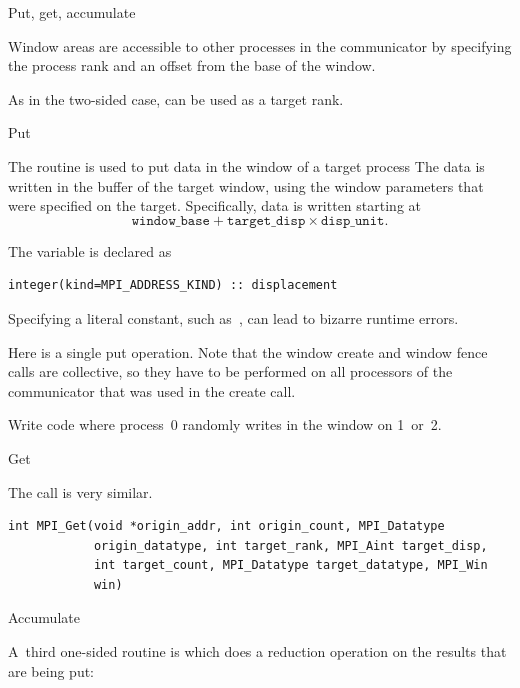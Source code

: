 
 {Put, get, accumulate}
\label{sec:putget}

Window areas are 
accessible to other processes in the communicator by specifying the
process rank and an offset from the base of the window.

As in the two-sided case,  can be used as
a target rank.

 {Put}

The  routine is used to put data in the window
of a target process
%
%
The data is written in the buffer of the target window,
using the window parameters that were specified on the target.
Specifically, data is written starting at
\[ \mathtt{window\_base} + \mathtt{target\_disp}\times \mathtt{disp\_unit}. \]

\begin{fortrannote}
  The  variable is declared as 
\begin{verbatim}
integer(kind=MPI_ADDRESS_KIND) :: displacement
\end{verbatim}
  Specifying a literal constant, such as~, can lead to bizarre
  runtime errors.
\end{fortrannote}

Here is a single put operation. Note that the window create and window fence calls
are collective, so they have to be performed on all processors
of the communicator that was used in the create call.

\begin{exercise}
  \label{ex:randomput}
  Write code where process~0 randomly writes in the window on 1~or~2.
  
\end{exercise}

 {Get}

The  call is very similar.
\begin{verbatim}
int MPI_Get(void *origin_addr, int origin_count, MPI_Datatype
            origin_datatype, int target_rank, MPI_Aint target_disp,
            int target_count, MPI_Datatype target_datatype, MPI_Win
            win)
\end{verbatim}


 {Accumulate}

A~third one-sided routine
is  which does a reduction operation on the results
that are being put:

